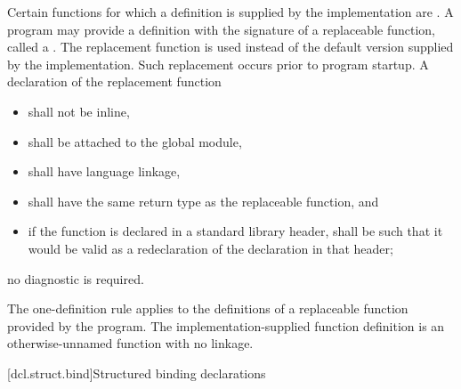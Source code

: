 \pnum
\label{term.replaceable.function}%
Certain functions
for which a definition is supplied by the implementation
are .
A \Cpp{} program may
provide a definition with the signature of a replaceable function,
called a .
The replacement function
is used instead of the default version
supplied by the implementation.
Such replacement occurs
prior to program startup.
A declaration of the replacement function
\begin{itemize}
\item
shall not be inline,
\item
shall be attached to the global module,
\item
shall have \Cpp{} language linkage,
\item
shall have the same return type as the replaceable function, and
\item
if the function is declared in a standard library header,
shall be such that it would be valid as a redeclaration
of the declaration in that header;
\end{itemize}
no diagnostic is required.
\begin{note}
The one-definition rule
applies to the definitions of a replaceable function
provided by the program.
The implementation-supplied function definition
is an otherwise-unnamed function with no linkage.
\end{note}
%

[dcl.struct.bind]{Structured binding declarations}%
%
%

